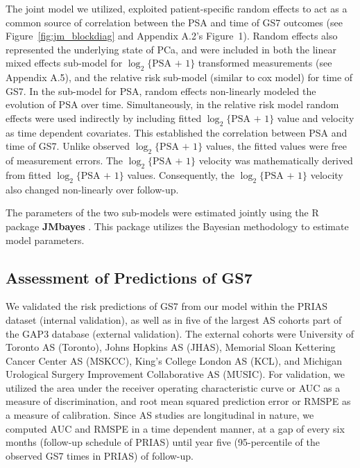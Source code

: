 The joint model we utilized, exploited patient-specific random effects \citep{laird1982random} to act as a common source of correlation between the PSA and time of GS7 outcomes (see Figure~\ref{fig:jm_blockdiag} and Appendix A.2's Figure~1). Random effects also represented the underlying state of PCa, and were included in both the linear mixed effects sub-model for $\log_2\{\mbox{PSA + 1}\}$ transformed measurements (see Appendix A.5), and the relative risk sub-model (similar to cox model) for time of GS7. In the sub-model for PSA, random effects non-linearly modeled the evolution of PSA over time. Simultaneously, in the relative risk model random effects were used indirectly by including fitted $\log_2\{\mbox{PSA + 1}\}$ value and velocity as time dependent covariates. This established the correlation between PSA and time of GS7. Unlike observed $\log_2\{\mbox{PSA + 1}\}$ values, the fitted values were free of measurement errors. The $\log_2\{\mbox{PSA + 1}\}$ velocity was mathematically derived from fitted $\log_2\{\mbox{PSA + 1}\}$ values. Consequently, the $\log_2\{\mbox{PSA + 1}\}$ velocity also changed non-linearly over follow-up.

The parameters of the two sub-models were estimated jointly using the R package \textbf{JMbayes} \citep{rizopoulosJMbayes}. This package utilizes the Bayesian methodology to estimate model parameters.

\subsection{Assessment of Predictions of GS7}
We validated the risk predictions of GS7 from our model within the PRIAS dataset (internal validation), as well as in five of the largest AS cohorts part of the GAP3 database \citep{gap3_2018} (external validation). The external cohorts were University of Toronto AS (Toronto), Johns Hopkins AS (JHAS), Memorial Sloan Kettering Cancer Center AS (MSKCC), King's College London AS (KCL), and Michigan Urological Surgery Improvement Collaborative AS (MUSIC). For validation, we utilized the area under the receiver operating characteristic curve or AUC \cite{rizopoulos2017dynamic} as a measure of discrimination, and root mean squared prediction error or RMSPE \cite{rizopoulos2017dynamic} as a measure of calibration. Since AS studies are longitudinal in nature, we computed AUC and RMSPE in a time dependent manner, at a gap of every six months (follow-up schedule of PRIAS) until year five (95-percentile of the observed GS7 times in PRIAS) of follow-up.

